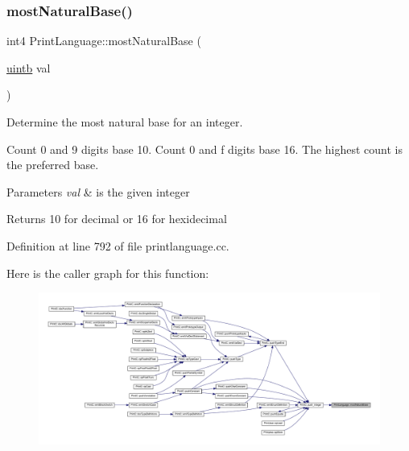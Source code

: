 \subsubsection{\texorpdfstring{mostNaturalBase()}{mostNaturalBase()}}
{\footnotesize\ttfamily int4 Print\+Language\+::most\+Natural\+Base (\begin{DoxyParamCaption}\item[{\mbox{\hyperlink{types_8h_a2db313c5d32a12b01d26ac9b3bca178f}{uintb}}}]{val }\end{DoxyParamCaption})\hspace{0.3cm}{\ttfamily [static]}}



Determine the most natural base for an integer. 

Count \textquotesingle{}0\textquotesingle{} and \textquotesingle{}9\textquotesingle{} digits base 10. Count \textquotesingle{}0\textquotesingle{} and \textquotesingle{}f\textquotesingle{} digits base 16. The highest count is the preferred base. 
\begin{DoxyParams}{Parameters}
{\em val} & is the given integer \\
\hline
\end{DoxyParams}
\begin{DoxyReturn}{Returns}
10 for decimal or 16 for hexidecimal 
\end{DoxyReturn}


Definition at line 792 of file printlanguage.\+cc.

Here is the caller graph for this function\+:
\nopagebreak
\begin{figure}[H]
\begin{center}
\leavevmode
\includegraphics[width=350pt]{class_print_language_ae49714ea4a8560619b0a71850c2ca3c1_icgraph}
\end{center}
\end{figure}
\mbox{\label{class_print_language_a685bceb682b22e22470d649e0d4c3308}} 
